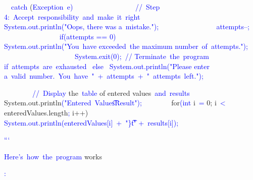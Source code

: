 \documentclass{article}
\begin{document}
\begin{tcolorbox}[colframe=black,colback=white]
{{{{{}           \textcolor{blue}{~}}\textcolor{blue}{~catch} (\textcolor{blue}{Exception}\textcolor{blue}{~e}\textcolor{blue}{)}\textcolor{blue}{~{
}\textcolor{blue}{~~~~~~~~~~~~~~~}\textcolor{blue}{~//}\textcolor{blue}{~Step} 4:\textcolor{blue}{~Accept}\textcolor{blue}{~responsibility}\textcolor{blue}{~and}\textcolor{blue}{~make}\textcolor{blue}{~it}\textcolor{blue}{~right}
\textcolor{blue}{~~~~~~~~~~~~~~~} System.out\textcolor{blue}{.println}("Oops, there was a\textcolor{blue}{~mistake}.");
\textcolor{blue}{~~~~~~~~~~~~~~~} attempts\textcolor{blue}{--;
}\textcolor{blue}{~~~~~~~~~~~~~~~} if(attempts == 0\textcolor{blue}{)}\textcolor{blue}{~{
}\textcolor{blue}{~~~~~~~~~~~~~~~~~~~} System\textcolor{blue}{.out}\textcolor{blue}{.println}("You\textcolor{blue}{~have} exceeded\textcolor{blue}{~the} maximum number\textcolor{blue}{~of}\textcolor{blue}{~attempts}.");
\textcolor{blue}{~~~~~~~~~~~~~~~~~~~}\textcolor{blue}{~System}.exit\textcolor{blue}{(}0);\textcolor{blue}{~//} Ter\textcolor{blue}{minate}\textcolor{blue}{~the}\textcolor{blue}{~program} if\textcolor{blue}{~attempts}\textcolor{blue}{~are}\textcolor{blue}{~exhausted}
                }\textcolor{blue}{~else}\textcolor{blue}{~{
}                    System.out\textcolor{blue}{.println}("Please enter a\textcolor{blue}{~valid}\textcolor{blue}{~number}\textcolor{blue}{.}\textcolor{blue}{~You}\textcolor{blue}{~have}\textcolor{blue}{~"}\textcolor{blue}{~+}\textcolor{blue}{~attempts}\textcolor{blue}{~+}\textcolor{blue}{~"}\textcolor{blue}{~attempts}\textcolor{blue}{~left}\textcolor{blue}{.");
}                }
           \textcolor{blue}{~}
}       \textcolor{blue}{~}

}\textcolor{blue}{~~~~~~~}\textcolor{blue}{~//}\textcolor{blue}{~Display} the\textcolor{blue}{~table} of entered values\textcolor{blue}{~and}\textcolor{blue}{~results}\textcolor{blue}{
}\textcolor{blue}{~~~~~~~} System.out.println\textcolor{blue}{("}\textcolor{blue}{Entered}\textcolor{blue}{~Values}\textcolor{blue}{\t}\textcolor{blue}{Result}\textcolor{blue}{");
}\textcolor{blue}{~~~~~~~} for\textcolor{blue}{(int} i\textcolor{blue}{~=} 0; i\textcolor{blue}{~<} enteredValues.length\textcolor{blue}{;} i++)\textcolor{blue}{~{
}\textcolor{blue}{~~~~~~~~~~~} System.out\textcolor{blue}{.println}(\textcolor{blue}{entered}Values[i]\textcolor{blue}{~+}\textcolor{blue}{~"\}t\textcolor{blue}{\t}\textcolor{blue}{"} +\textcolor{blue}{~results}[i]);
        }
   \textcolor{blue}{~}
}\textcolor{blue}{}
}\textcolor{blue}{```}\textcolor{blue}{

}\textcolor{blue}{Here}\textcolor{blue}{'s}\textcolor{blue}{~how}\textcolor{blue}{~the}\textcolor{blue}{~program} works\textcolor{blue}{:

}}
\end{tcolorbox}
\end{document}
